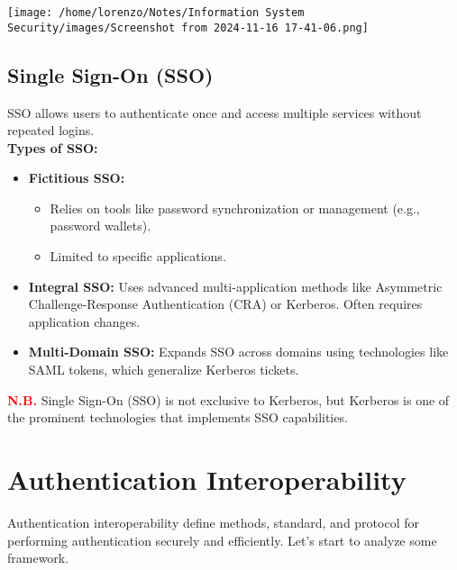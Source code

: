 \begin{enumerate}
\begin{minipage}{0.5\textwidth}
\begin{customquote}
        \end{customquote}
    \end{minipage} 
    \hspace{1cm}
    \begin{minipage}{0.3\textwidth}
        \centering
        \texttt{[image: /home/lorenzo/Notes/Information System Security/images/Screenshot from 2024-11-16 17-41-06.png]}
    \end{minipage}
\end{enumerate}

\subsection{Single Sign-On (SSO)}
SSO allows users to authenticate once and access multiple services without repeated logins.\\
\textbf{Types of SSO:}
\begin{itemize}
    \item \textbf{Fictitious SSO:}
    \begin{itemize}
        \item Relies on tools like password synchronization or management (e.g., password wallets).
        \item Limited to specific applications.
    \end{itemize}
    \item \textbf{Integral SSO:} Uses advanced multi-application methods like Asymmetric Challenge-Response Authentication (CRA) or Kerberos.
    Often requires application changes.
    \item \textbf{Multi-Domain SSO:} Expands SSO across domains using technologies like SAML tokens, which generalize Kerberos tickets.
\end{itemize}
\textcolor{red}{\textbf{N.B.}} Single Sign-On (SSO) is not exclusive to Kerberos, but Kerberos is one of the prominent technologies that implements SSO capabilities.

\section{Authentication Interoperability}
Authentication interoperability define methods, standard, and protocol for performing authentication securely and efficiently. Let's start to analyze some framework.

